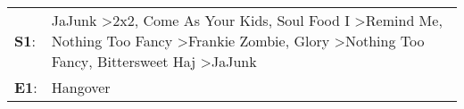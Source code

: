 \begin{supertabular}{p{0.03\textwidth}p{0.92\textwidth}}
 \textbf{S1}:  &  JaJunk\textsuperscript{} \textgreater \enspace 2x2\textsuperscript{}, \enspace Come As Your Kids\textsuperscript{}, \enspace Soul Food I\textsuperscript{} \textgreater \enspace Remind Me\textsuperscript{}, \enspace Nothing Too Fancy\textsuperscript{} \textgreater \enspace Frankie Zombie\textsuperscript{}, \enspace Glory\textsuperscript{} \textgreater \enspace Nothing Too Fancy\textsuperscript{}, \enspace Bittersweet Haj\textsuperscript{} \textgreater \enspace JaJunk\textsuperscript{}  \enspace  \\
 \textbf{E1}:  &                                                                                                                                                                                                                                                                                                                                                                                                                                                                                Hangover\textsuperscript{}  \enspace  \\
\end{supertabular}
